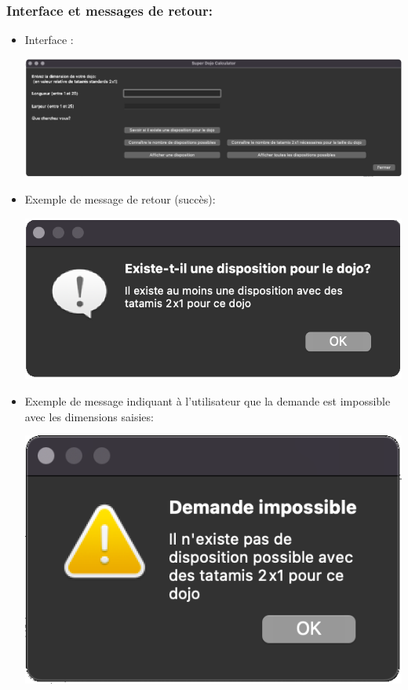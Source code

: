 

\subsubsection*{Interface et messages de retour:}


\begin{itemize}


    \item Interface :

          \begin{center}
              \includegraphics[width=16cm]{images/betaInterface.png}
          \end{center}


    \item Exemple de message de retour (succès):

          \begin{center}
              \includegraphics[scale=0.25]{images/betaRetourSucces.png}
          \end{center}


    \item Exemple de message indiquant à l’utilisateur que la demande est impossible avec les dimensions saisies:

          \begin{center}
              \includegraphics[scale=0.25]{images/betaImpossible.png}
          \end{center}



\end{itemize}
